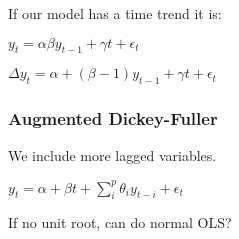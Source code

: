If our model has a time trend it is:

\(y_t=\alpha \beta y_{t-1}+\gamma t + \epsilon_t\)

\(\Delta y_t=\alpha + (\beta -1)y_{t-1}+\gamma t+\epsilon_t\)

\subsubsection{Augmented Dickey-Fuller}

We include more lagged variables.

\(y_t=\alpha + \beta t + \sum_i^p \theta_i y_{t-i}+\epsilon_t\)

If no unit root, can do normal OLS?


